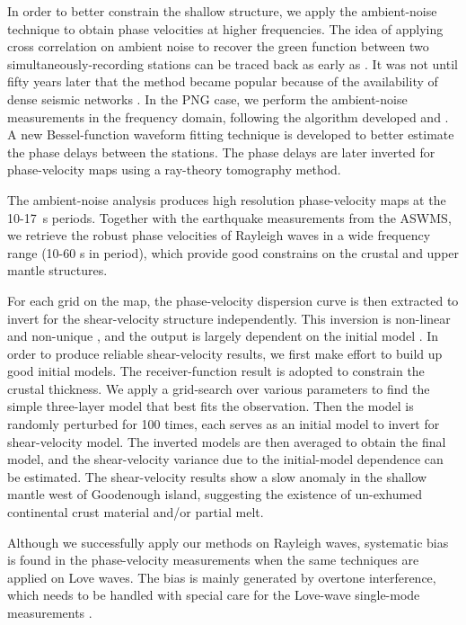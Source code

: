 \documentclass[12pt,oneside]{book}
\begin{document}
In order to better constrain the shallow structure, we apply the ambient-noise technique to obtain phase velocities at higher frequencies.
The idea of applying cross correlation on ambient noise to recover the green function between two simultaneously-recording stations can be traced back as early as \citet{Aki:1957un}. 
It was not until fifty years later that the method became popular because of the availability of dense seismic networks \citep[e.g.][]{Shapiro:2005kz,Bensen:2007hl}. 
In the PNG case, we perform the ambient-noise measurements in the frequency domain, following the algorithm developed \citet{Ekstrom:2009iv} and \citet{Ekstrom:2013dr}. 
A new Bessel-function waveform fitting technique is developed to better estimate the phase delays between the stations. The phase delays are later inverted for phase-velocity maps using a ray-theory tomography method.

The ambient-noise analysis produces high resolution phase-velocity maps at the 10-17~s periods. Together with the earthquake measurements from the ASWMS, we retrieve the robust phase velocities of Rayleigh waves in a wide frequency range (10-60 s in period), which provide good constrains on the crustal and upper mantle structures.

For each grid on the map, the phase-velocity dispersion curve is then extracted to invert for the shear-velocity structure independently. This inversion is non-linear and non-unique \citep{Herrmann:2004wl}, and the output is largely dependent on the initial model \citep[e.g.][]{Foti:2009uo}. In order to produce reliable shear-velocity results, we first make effort to build up good initial models. 
The receiver-function result \citep{Abers:2012ul} is adopted to constrain the crustal thickness. We apply a grid-search over various parameters to find the simple three-layer model that best fits the observation. 
Then the model is randomly perturbed for 100 times, each serves as an initial model to invert for shear-velocity model. 
The inverted models are then averaged to obtain the final model, and the shear-velocity variance due to the initial-model dependence can be estimated. 
The shear-velocity results show a slow anomaly in the shallow mantle west of Goodenough island, suggesting the existence of un-exhumed continental crust material and/or partial melt.

Although we successfully apply our methods on Rayleigh waves, systematic bias is found in the phase-velocity measurements when  the same techniques are applied on Love waves. 
The bias is mainly generated by overtone interference, which needs to be handled with special care for the Love-wave single-mode measurements \citep[e.g.][]{Thatcher:1969hg,Forsyth:1975tp,Gaherty:1996uf}.
\end{document}
